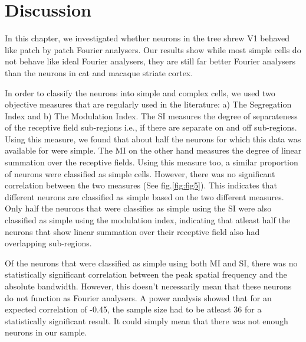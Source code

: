 	
	\section{Discussion}
	
	In this chapter, we investigated whether neurons in the tree shrew V1 behaved like patch by patch Fourier analysers. Our results show while most simple cells do not behave like ideal Fourier analysers, they are still far better Fourier analysers than the neurons in cat and macaque striate cortex.
	
	In order to classify the neurons into simple and complex cells, we used two objective measures that are regularly used in the literature: a) The Segregation Index and b) The Modulation Index. The SI measures the degree of separateness of the receptive field sub-regions i.e., if there are separate on and off sub-regions. Using this measure, we found that about half the neurons for which this data was available for were simple. The MI on the other hand measures the degree of linear summation over the receptive fields. Using this measure too, a similar proportion of  neurons were classified as simple cells. However, there was no significant correlation between the two measures (See fig.\ref{fig:fig5}). This indicates that different neurons are classified as simple based on the two different measures. Only half the neurons that were classifies as simple using the SI were also classified as simple using the modulation index, indicating that atleast half the neurons that show linear summation over their receptive field also had overlapping sub-regions. 
	
	Of the neurons that were classified as simple using both MI and SI, there was no statistically significant correlation between the peak spatial frequency and the absolute bandwidth. However, this doesn't necessarily mean that these neurons do not function as Fourier analysers. A power analysis showed that for an expected correlation of -0.45, the sample size had to be atleast 36 for a statistically significant result. It could simply mean that there was not enough neurons in our sample.
	
